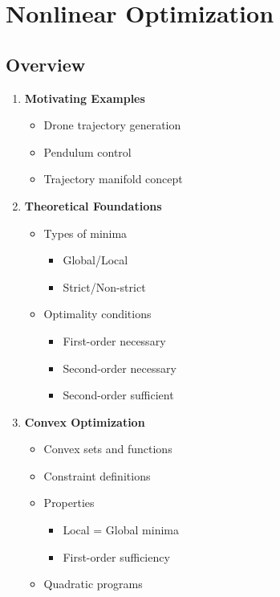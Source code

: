 \documentclass[openany]{book}
\theoremstyle{definition}
\theoremstyle{remark}
\begin{document}
\chapter{Nonlinear Optimization}

\section{Overview}

\begin{enumerate}
    \item \textbf{Motivating Examples}
        \begin{itemize}
            \item Drone trajectory generation
            \item Pendulum control
            \item Trajectory manifold concept
        \end{itemize}
    
    \item \textbf{Theoretical Foundations}
        \begin{itemize}
            \item Types of minima
                \begin{itemize}
                    \item Global/Local
                    \item Strict/Non-strict
                \end{itemize}
            \item Optimality conditions
                \begin{itemize}
                    \item First-order necessary
                    \item Second-order necessary
                    \item Second-order sufficient
                \end{itemize}
        \end{itemize}
    
    \item \textbf{Convex Optimization}
        \begin{itemize}
            \item Convex sets and functions
            \item Constraint definitions
            \item Properties
                \begin{itemize}
                    \item Local = Global minima
                    \item First-order sufficiency
                \end{itemize}
            \item Quadratic programs
        \end{itemize}
    

\end{enumerate}
\end{document}
